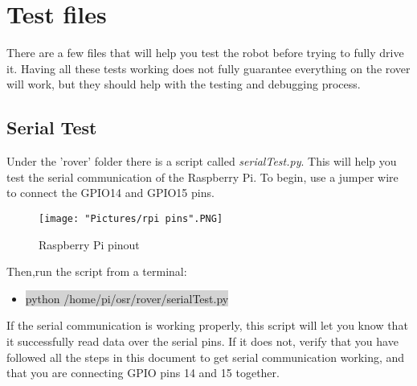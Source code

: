 \documentclass[12pt]{article}
\begin{document}
\section{Test files}
There are a few files that will help you test the robot before trying to fully drive it. Having all these tests working does not fully guarantee everything on the rover will work, but they should help with the testing and debugging process.

\subsection{Serial Test}

Under the 'rover' folder there is a script called \textit{serialTest.py}. This will help you test the serial communication of the Raspberry Pi. To begin, use a jumper wire to connect the GPIO14 and GPIO15 pins. 

\begin{figure}[H]
 	\centering
	\texttt{[image: "Pictures/rpi pins".PNG]}
 	\caption{Raspberry Pi pinout}
	\label{rpi pin}
\end{figure}


Then,run the script from a terminal:
\begin{itemize}
	\item[] \colorbox{lightgray}{python /home/pi/osr/rover/serialTest.py}
\end{itemize}

If the serial communication is working properly, this script will let you know that it successfully read data over the serial pins. If it does not, verify that you have followed all the steps in this document to get serial communication working, and that you are connecting GPIO pins 14 and 15 together. 
\end{document}
